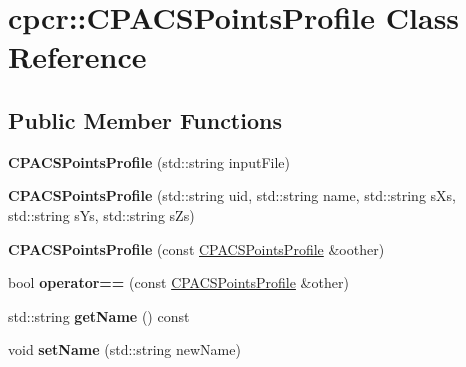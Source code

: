 \hypertarget{classcpcr_1_1CPACSPointsProfile}{\section{cpcr\-:\-:C\-P\-A\-C\-S\-Points\-Profile Class Reference}
\label{classcpcr_1_1CPACSPointsProfile}
}
\subsection*{Public Member Functions}
\begin{DoxyCompactItemize}
\item 
\hypertarget{classcpcr_1_1CPACSPointsProfile_abd84274693d65de648d0a7e0f3386f8b}{{\bfseries C\-P\-A\-C\-S\-Points\-Profile} (std\-::string input\-File)}\label{classcpcr_1_1CPACSPointsProfile_abd84274693d65de648d0a7e0f3386f8b}

\item 
\hypertarget{classcpcr_1_1CPACSPointsProfile_aee7280ee038bdd60484f655ce3442404}{{\bfseries C\-P\-A\-C\-S\-Points\-Profile} (std\-::string uid, std\-::string name, std\-::string s\-Xs, std\-::string s\-Ys, std\-::string s\-Zs)}\label{classcpcr_1_1CPACSPointsProfile_aee7280ee038bdd60484f655ce3442404}

\item 
\hypertarget{classcpcr_1_1CPACSPointsProfile_aa746e6200f5555ba9f7f348c11c4a125}{{\bfseries C\-P\-A\-C\-S\-Points\-Profile} (const \hyperlink{classcpcr_1_1CPACSPointsProfile}{C\-P\-A\-C\-S\-Points\-Profile} \&oother)}\label{classcpcr_1_1CPACSPointsProfile_aa746e6200f5555ba9f7f348c11c4a125}

\item 
\hypertarget{classcpcr_1_1CPACSPointsProfile_a7e5b90b142b0d6d90f15ebb0e8564d3d}{bool {\bfseries operator==} (const \hyperlink{classcpcr_1_1CPACSPointsProfile}{C\-P\-A\-C\-S\-Points\-Profile} \&other)}\label{classcpcr_1_1CPACSPointsProfile_a7e5b90b142b0d6d90f15ebb0e8564d3d}

\item 
\hypertarget{classcpcr_1_1CPACSPointsProfile_a12e67cc211f714c43493126391c66593}{std\-::string {\bfseries get\-Name} () const }\label{classcpcr_1_1CPACSPointsProfile_a12e67cc211f714c43493126391c66593}

\item 
\hypertarget{classcpcr_1_1CPACSPointsProfile_ad51a5beaa356a9ffcdf27ddec63af615}{void {\bfseries set\-Name} (std\-::string new\-Name)}\label{classcpcr_1_1CPACSPointsProfile_ad51a5beaa356a9ffcdf27ddec63af615}


\end{DoxyCompactItemize}
